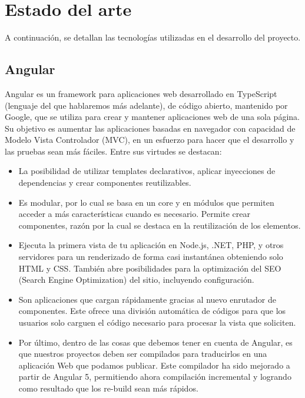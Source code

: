 \documentclass[a4paper, 12pt]{book}
\begin{document}

\cleardoublepage
\chapter{Estado del arte}
\label{chap:estado}

A continuación, se detallan las tecnologías utilizadas en el desarrollo del proyecto.



\section{Angular} 
\label{sec:Angular}
Angular es un framework para aplicaciones web desarrollado en TypeScript (lenguaje del que hablaremos más adelante), de código abierto, mantenido por Google, que se utiliza para crear y mantener aplicaciones web de una sola página. Su objetivo es aumentar las aplicaciones basadas en navegador con capacidad de Modelo Vista Controlador (MVC), en un esfuerzo para hacer que el desarrollo y las pruebas sean más fáciles.
\vfill
Entre sus virtudes se destacan:
\begin{itemize}
\item La posibilidad de utilizar templates declarativos, aplicar inyecciones de dependencias y crear componentes reutilizables.

\item Es modular, por lo cual se basa en un core y en módulos que permiten acceder a más características cuando es necesario. Permite crear componentes, razón por la cual se destaca en la reutilización de los elementos.


\item Ejecuta la primera vista de tu aplicación en Node.js, .NET, PHP, y otros servidores para un renderizado de forma casi instantánea obteniendo solo HTML y CSS. También abre posibilidades para la optimización del SEO (Search Engine Optimization) del sitio, incluyendo configuración.

\item Son aplicaciones que cargan rápidamente gracias al nuevo enrutador de componentes. Este ofrece una división automática de códigos para que los usuarios solo carguen el código necesario para procesar la vista que soliciten.

\item Por último, dentro de las cosas que debemos tener en cuenta de Angular, es que nuestros proyectos deben ser compilados para traducirlos en una aplicación Web que podamos publicar. Este compilador ha sido mejorado a partir de Angular 5, permitiendo ahora compilación incremental y logrando como resultado que los re-build sean más rápidos.
\end{itemize}
\end{document}
